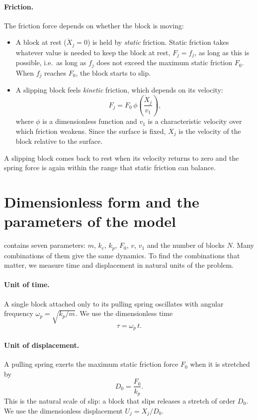 \paragraph{Friction.} The friction force depends on whether the block is moving:
\begin{itemize}
  \item A block at rest ($\dot X_j = 0$) is held by \emph{static} friction. Static friction takes whatever
    value is needed to keep the block at rest, $F_j = f_j$, as long as this is possible, i.e.\ as long as
    $f_j$ does not exceed the maximum static friction $F_0$. When $f_j$ reaches $F_0$, the block starts to
    slip.
  \item A slipping block feels \emph{kinetic} friction, which depends on its velocity:
    \begin{equation}
      F_j = F_0\,\phi\!\left(\frac{\dot X_j}{v_1}\right),
    \end{equation}
    where $\phi$ is a dimensionless function and $v_1$ is a characteristic velocity over which friction
    weakens. Since the surface is fixed, $\dot X_j$ is the velocity of the block relative to the surface.
\end{itemize}
A slipping block comes back to rest when its velocity returns to zero and the spring force is again within
the range that static friction can balance.

\section{Dimensionless form and the parameters of the model}
\label{sec:bk-units}

 contains seven parameters: $m$, $k_c$, $k_p$, $F_0$, $v$, $v_1$ and the number of blocks
$N$. Many combinations of them give the same dynamics. To find the combinations that matter, we measure
time and displacement in natural units of the problem.

\paragraph{Unit of time.} A single block attached only to its pulling spring oscillates with angular
frequency $\omega_p = \sqrt{k_p/m}$. We use the dimensionless time
\begin{equation}
  \tau = \omega_p\, t .
\end{equation}

\paragraph{Unit of displacement.} A pulling spring exerts the maximum static friction force $F_0$ when it is
stretched by
\begin{equation}
  D_0 = \frac{F_0}{k_p} .
\end{equation}
This is the natural scale of slip: a block that slips releases a stretch of order $D_0$. We use the
dimensionless displacement $U_j = X_j/D_0$.

